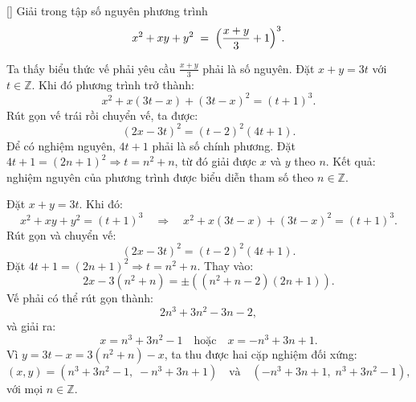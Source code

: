 \documentclass[../04-diophantine-equations.tex]{subfiles}
\begin{document}
\begin{example*}\label{example:USA-2015-MO-P1}[\textbf{}]
	Giải trong tập số nguyên phương trình  
	\[
		x^2 + xy + y^2 \;=\; \Bigl(\frac{x+y}{3} + 1\Bigr)^3.
	\]
\end{example*}

\begin{story*}
    Ta thấy biểu thức vế phải yêu cầu \( \frac{x+y}{3} \) phải là số nguyên. Đặt \( x + y = 3t \) với \( t \in \mathbb{Z} \).  
    Khi đó phương trình trở thành:
    \[
        x^2 + x(3t - x) + (3t - x)^2 = (t + 1)^3.
    \]
    Rút gọn vế trái rồi chuyển vế, ta được:
    \[
        (2x - 3t)^2 = (t - 2)^2(4t + 1).
    \]
    Để có nghiệm nguyên, \( 4t + 1 \) phải là số chính phương. Đặt \( 4t + 1 = (2n + 1)^2 \Rightarrow t = n^2 + n \),  
    từ đó giải được \( x \) và \( y \) theo \( n \). Kết quả: nghiệm nguyên của phương trình được biểu diễn tham số theo \( n \in \mathbb{Z} \).
\end{story*}

\bigbreak

\begin{soln}\footnotemark
	Đặt \(x+y=3t\). Khi đó:
	\[
		x^2 + xy + y^2 = (t+1)^3
		\quad\Longrightarrow\quad
		x^2 + x(3t - x) + (3t - x)^2 = (t+1)^3.
	\]
	Rút gọn và chuyển vế:
	\[
		(2x - 3t)^2 = (t - 2)^2 (4t + 1).
	\]
	Đặt \( 4t + 1 = (2n + 1)^2 \Rightarrow t = n^2 + n \). Thay vào:
	\[
		2x - 3(n^2 + n) = \pm\left( (n^2 + n - 2)(2n + 1) \right).
	\]
	Vế phải có thể rút gọn thành:
	\[
		2n^3 + 3n^2 - 3n - 2,
	\]
	và giải ra:
	\[
		x = n^3 + 3n^2 - 1 \quad \text{hoặc} \quad x = -n^3 + 3n + 1.
	\]
	Vì \( y = 3t - x = 3(n^2 + n) - x \), ta thu được hai cặp nghiệm đối xứng:
	\[
		(x, y) = \left(n^3 + 3n^2 - 1,\; -n^3 + 3n + 1\right)
		\quad \text{và} \quad
		(-n^3 + 3n + 1,\; n^3 + 3n^2 - 1),
	\]
	với mọi \( n \in \mathbb{Z} \).
\end{soln}

\end{document}
